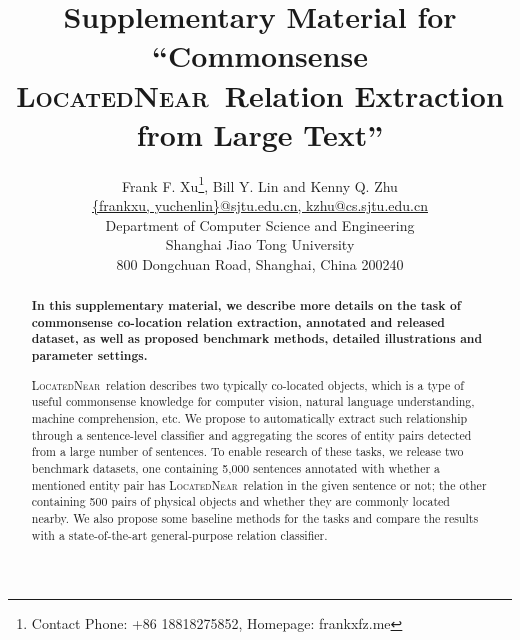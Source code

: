 \documentclass[letterpaper]{article} %
\newcommand{\lnear}{\textsc{LocatedNear}}
\begin{document}
\title{Supplementary Material for ``Commonsense \lnear~Relation Extraction from Large Text''}
\author{
	Frank F. Xu\thanks{Contact Phone: +86 18818275852, Homepage: frankxfz.me},
	Bill Y. Lin and
	Kenny Q. Zhu
	\\[0.5ex]
	\url{{frankxu, yuchenlin}@sjtu.edu.cn, kzhu@cs.sjtu.edu.cn}\\[0.5ex]
	Department of Computer Science and Engineering\\[0.5ex]
	Shanghai Jiao Tong University\\[0.5ex]
	800 Dongchuan Road, Shanghai, China 200240
}
\maketitle

\begin{abstract}
\textbf{In this supplementary material, we describe more details on the task of commonsense co-location relation extraction, annotated and released dataset, as well as proposed benchmark methods, detailed illustrations and parameter settings.}


\lnear~relation describes two typically co-located objects, 
which is a type of useful commonsense knowledge for 
computer vision, natural language understanding, machine comprehension, etc. 
We propose to automatically extract such relationship through
a sentence-level classifier and aggregating the scores of
entity pairs detected from a large number of sentences.
To enable research of these tasks, we release two benchmark datasets, 
one containing 5,000 sentences annotated with whether a mentioned entity pair has \lnear~relation in the given sentence or not; 
the other containing 500 pairs of physical objects and whether they are 
commonly located nearby.
We also propose some baseline methods for the tasks and compare the results with a state-of-the-art general-purpose relation classifier.
\end{abstract}
















\end{document}
